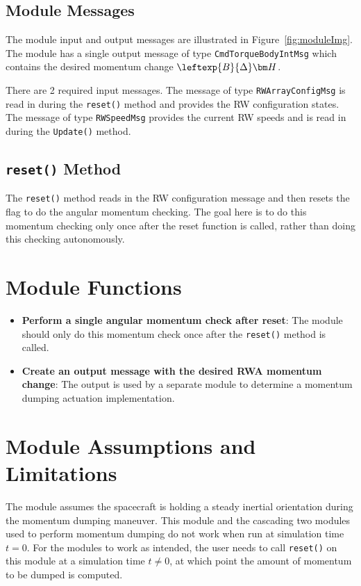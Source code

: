 \documentclass[]{BasiliskReportMemo}
\begin{document}
\subsection{Module Messages}
The module input and output messages are illustrated in Figure~\ref{fig:moduleImg}.  The module has a single output message of type {\tt CmdTorqueBodyIntMsg} which contains the desired momentum change $\leftexp{B}{\Delta}\bm H$.

There are 2 required input messages.  The message of type {\tt RWArrayConfigMsg} is read in during the {\tt reset()} method and provides the RW configuration states.  The message of type {\tt RWSpeedMsg} provides the current RW speeds and is read in during the {\tt Update()} method.

\subsection{{\tt reset()} Method}
The {\tt reset()} method reads in the RW configuration message and then resets the flag to do the angular momentum checking.  The goal here is to do this momentum checking only once after the reset function is called, rather than doing this checking autonomously.









\section{Module Functions}
\begin{itemize}
	\item \textbf{Perform a single angular momentum check after reset}: The module should only do this momentum check once after the {\tt reset()} method is called.
	\item \textbf{Create an output message with the desired RWA momentum change}: The output is used by a separate module to determine a momentum dumping actuation implementation.
\end{itemize}

\section{Module Assumptions and Limitations}
The module assumes the spacecraft is holding a steady inertial orientation during the momentum dumping maneuver. This module and the cascading two modules used to perform momentum dumping do not work when run at simulation time $t=0$. For the modules to work as intended, the user needs to call \texttt{reset()} on this module at a simulation time $t \neq 0$, at which point the amount of momentum to be dumped is computed.
\end{document}
